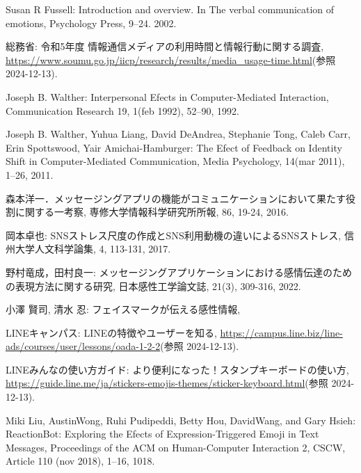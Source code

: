 \documentclass[11pt,a4paper]{ltjsreport}
\begin{document}
\begin{thebibliography}{99} %
    Susan R Fussell: Introduction and overview. In The verbal communication of emotions, 
    Psychology Press, 9–24. 2002.

    総務省: 令和5年度 情報通信メディアの利用時間と情報行動に関する調査,
    \url{https://www.soumu.go.jp/iicp/research/results/media_usage-time.html}(参照 2024-12-13).

    Joseph B. Walther: Interpersonal Efects in Computer-Mediated Interaction, 
    Communication Research 19, 1(feb 1992), 52–90, 1992.

    Joseph B. Walther, Yuhua Liang, David DeAndrea, Stephanie Tong, Caleb Carr, 
    Erin Spottswood, Yair Amichai-Hamburger:
    The Efect of Feedback on Identity Shift in Computer-Mediated Communication, 
    Media Psychology, 14(mar 2011), 1–26, 2011.

    森本洋一．メッセージングアプリの機能がコミュニケーションにおいて果たす役割に関する一考察,
    専修大学情報科学研究所所報, 86, 19-24, 2016.

    岡本卓也: SNSストレス尺度の作成とSNS利用動機の違いによるSNSストレス,
    信州大学人文科学論集, 4, 113-131, 2017.

    野村竜成，田村良一: メッセージングアプリケーションにおける感情伝達のための表現方法に関する研究,
    日本感性工学論文誌, 21(3), 309-316, 2022.

    小澤 賢司, 清水 忍: フェイスマークが伝える感性情報,

    LINEキャンパス: LINEの特徴やユーザーを知る,
    \url{https://campus.line.biz/line-ads/courses/user/lessons/oada-1-2-2}(参照 2024-12-13).

    LINEみんなの使い方ガイド: より便利になった！スタンプキーボードの使い方,
    \url{https://guide.line.me/ja/stickers-emojis-themes/sticker-keyboard.html}(参照 2024-12-13).

    Miki Liu, AustinWong, Ruhi Pudipeddi, Betty Hou, DavidWang, and Gary Hsieh: 
    ReactionBot: Exploring the Efects of Expression-Triggered Emoji in Text Messages, 
    Proceedings of the ACM on Human-Computer Interaction 2, CSCW,
    Article 110 (nov 2018), 1–16, 1018.


\end{thebibliography}
\end{document}
